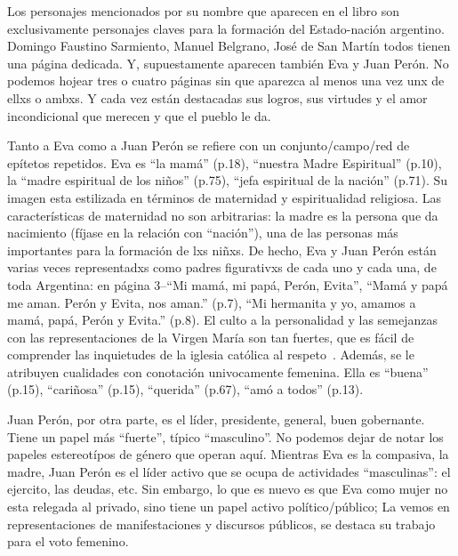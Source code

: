 Los personajes mencionados por su nombre que aparecen en el libro son exclusivamente personajes claves para la formación del Estado-nación argentino.
Domingo Faustino Sarmiento, Manuel Belgrano, José de San Martín todos tienen una página dedicada.
Y, supuestamente aparecen también Eva y Juan Perón.
No podemos hojear tres o cuatro páginas sin que aparezca al menos una vez unx de ellxs o ambxs.
Y cada vez están destacadas sus logros, sus virtudes y el amor incondicional que merecen y que el pueblo le da.

Tanto a Eva como a Juan Perón se refiere con un conjunto/campo/red de epítetos repetidos.
Eva es ``la mamá'' (p.18), ``nuestra Madre Espiritual'' (p.10), la ``madre espiritual de los niños'' (p.75), ``jefa espiritual de la nación'' (p.71).
Su imagen esta estilizada en términos de maternidad y espiritualidad religiosa.
Las características de maternidad no son arbitrarias: la madre es la persona que da nacimiento (fíjase en la relación con ``nación''), una de las personas más importantes para la formación de lxs niñxs.
De hecho, Eva y Juan Perón están varias veces representadxs como padres figurativxs de cada uno y cada una, de toda Argentina:
en página 3--``Mi mamá, mi papá, Perón, Evita'', ``Mamá y papá me aman. Perón y Evita, nos aman.'' (p.7), ``Mi hermanita y yo, amamos a mamá, papá, Perón y Evita.'' (p.8).
El culto a la personalidad y las semejanzas con las representaciones de la Virgen María son tan fuertes, que es fácil de comprender las inquietudes de la iglesia católica al respeto~\autocite{Chamosa2010}.
Además, se le atribuyen cualidades con conotación univocamente femenina.
Ella es ``buena'' (p.15), ``cariñosa'' (p.15), ``querida'' (p.67), ``amó a todos'' (p.13).

Juan Perón, por otra parte, es el líder, presidente, general, buen gobernante.
Tiene un papel más ``fuerte'', típico ``masculino''.
No podemos dejar de notar los papeles estereotípos de género que operan aquí.
Mientras Eva es la compasiva, la madre, Juan Perón es el líder activo que se ocupa de actividades ``masculinas'': el ejercito, las deudas, etc.
Sin embargo, lo que es nuevo es que Eva como mujer no esta relegada al privado, sino tiene un papel activo político/público;
La vemos en representaciones de manifestaciones y discursos públicos, se destaca su trabajo para el voto femenino.

